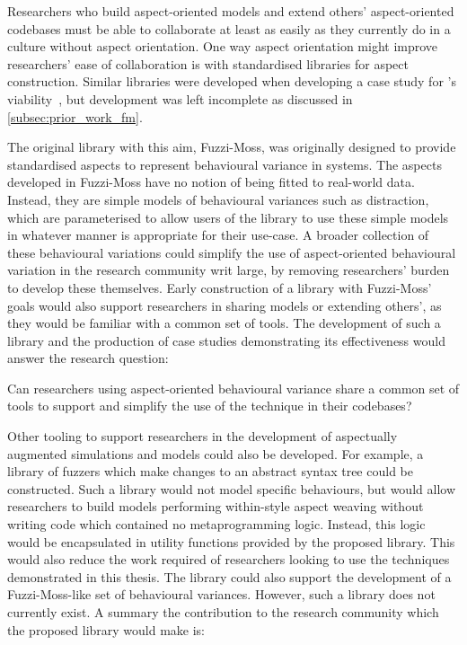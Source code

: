 Researchers who build aspect-oriented models and extend others' aspect-oriented
codebases must be able to collaborate at least as easily as they currently do in
a culture without aspect orientation. One way aspect orientation might improve
researchers' ease of collaboration is with standardised libraries for aspect
construction. Similar libraries were developed when developing a case study for
\pdsf{}'s viability~\cite{wallis2018caise,fuzzimoss_repo}, but development was
left incomplete as discussed in \cref{subsec:prior_work_fm}.

The original library with this aim, Fuzzi-Moss, was originally designed to
provide standardised aspects to represent behavioural variance in
\sociotechnical systems. The aspects developed in Fuzzi-Moss have no notion of
being fitted to real-world data. Instead, they are simple models of behavioural
variances such as distraction, which are parameterised to allow users of the
library to use these simple models in whatever manner is appropriate for their
use-case. A broader collection of these behavioural variations could simplify
the use of aspect-oriented behavioural variation in the research community writ
large, by removing researchers' burden to develop these themselves. Early
construction of a library with Fuzzi-Moss' goals would also support researchers
in sharing models or extending others', as they would be familiar with a common
set of tools. The development of such a library and the production of case
studies demonstrating its effectiveness would answer the research question:

\begin{researchquestion}
    Can researchers using aspect-oriented behavioural variance share a common
    set of tools to support and simplify the use of the technique in their
    codebases?
\end{researchquestion}

Other tooling to support researchers in the development of aspectually augmented
simulations and models could also be developed. For example, a library of
fuzzers which make changes to an abstract syntax tree could be constructed. Such
a library would not model specific behaviours, but would allow researchers to
build models performing within-style aspect weaving without writing code which
contained no metaprogramming logic. Instead, this logic would be encapsulated in
utility functions provided by the proposed library. This would also reduce the
work required of researchers looking to use the techniques demonstrated in this
thesis. The library could also support the development of a Fuzzi-Moss-like set
of \sociotechnical behavioural variances. However, such a library does not
currently exist. A summary the contribution to the research community which the
proposed library would make is:

